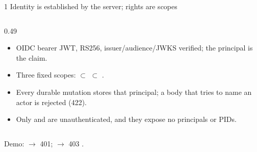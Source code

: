 \begin{frame}{1 \quad Identity is established by the server; rights are scopes}
\begin{columns}[T]
\begin{column}{0.49\textwidth}
\begin{block}{\vtwo{}}
\begin{itemize}
                    \item OIDC bearer JWT, RS256, issuer/audience/JWKS verified; the principal is the  claim.
                    \item Three fixed scopes:  $\subset$  $\subset$ .
                    \item Every durable mutation stores that principal; a body that tries to name an actor is rejected (422).
                    \item Only  and  are unauthenticated, and they expose no principals or PIDs.
                \end{itemize}
            \end{block}
        \end{column}
    \end{columns}
    \vspace{0.1cm}
    {\footnotesize\color{qsgray} Demo:  $\rightarrow$ 401;\quad
     $\rightarrow$ 403 .\par}
\end{frame}

